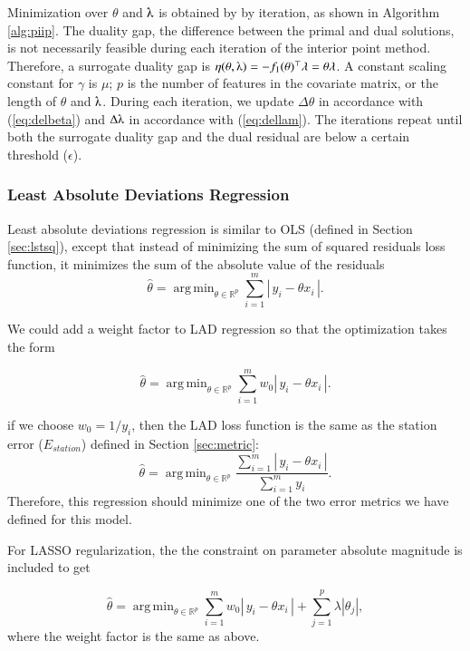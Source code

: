 \documentclass[11pt]{article}
\DeclareMathOperator*{\argmin}{arg\,min}
\begin{document}
Minimization over $\theta$ and $\lambdaup$ is obtained by by iteration, as shown in Algorithm \ref{alg:piip}. The duality gap, the difference between the primal and dual solutions, is not necessarily feasible during each iteration of the interior point method. Therefore, a surrogate duality gap is $\eta(\theta, \lambdaup) = -f_1(\theta)^\top\lambda = \theta\lambda$. A constant scaling constant for $\gamma$ is $\mu$; $p$ is the number of features in the covariate matrix, or the length of $\theta$ and $\lambdaup$. During each iteration, we update $\Delta\theta$ in accordance with (\ref{eq:delbeta}) and $\Delta\lambdaup$ in accordance with (\ref{eq:dellam}). The iterations repeat until both the surrogate duality gap and the dual residual are below a certain threshold ($\epsilon$).

\subsubsection{Least Absolute Deviations Regression} \label{sec:lad}

Least absolute deviations regression is similar to OLS (defined in Section \ref{sec:lstsq}), except that instead of minimizing the sum of squared residuals loss function, it minimizes the sum of the absolute value of the residuals
\[\hat{\theta} = \argmin_{\theta\in\mathbb{R}^p}\sum_{i=1}^m \left|\,y_i - \theta x_i\,\right|.\]

We could add a weight factor to LAD regression so that the optimization takes the form

\[\hat{\theta} = \argmin_{\theta\in\mathbb{R}^p}\sum_{i=1}^m w_0\left|\,y_i - \theta x_i\,\right|.\]

if we choose $w_0 = 1 / y_i$, then the LAD loss function is the same as the station error ($E_{station}$) defined in Section \ref{sec:metric}:
\[\hat{\theta} = \argmin_{\theta\in\mathbb{R}^p}\displaystyle\frac{\sum\limits_{i=1}^m \left|\,y_i - \theta x_i\,\right|}{\sum\limits_{i=1}^{m}y_i}.\] Therefore, this regression should minimize one of the two error metrics we have defined for this model. 

For LASSO regularization, the the constraint on parameter absolute magnitude is included to get

\[\hat{\theta} = \argmin_{\theta\in\mathbb{R}^p}\sum_{i=1}^m w_0\left|\,y_i - \theta x_i\,\right| + \sum_{j=1}^p\lambda\left|\theta_j\right|,\] where the weight factor is the same as above.
\end{document}
